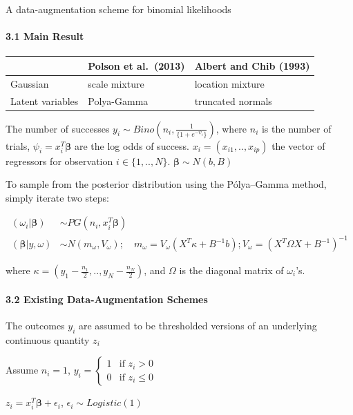 \documentclass[
]{article}
\begin{document}
A data-augmentation scheme for binomial likelihoods

\hypertarget{main-result}{%
\paragraph{3.1 Main Result}\label{main-result}}

\begin{longtable}[]{@{}lll@{}}
\toprule
& Polson et al.~(2013) & Albert and Chib (1993)\tabularnewline
\midrule
\endhead
Gaussian & scale mixture & location mixture\tabularnewline
Latent variables & Polya-Gamma & truncated normals\tabularnewline
\bottomrule
\end{longtable}

The number of successes
\(y_i\sim Bino(n_i,\frac{1}{\{1+e^{-\psi_i}\}})\), where \(n_i\) is the
number of trials, \(\psi_i=x_i^T\boldsymbol{\beta}\) are the log odds of
success. \(x_i=(x_{i1},..,x_{ip} )\) the vector of regressors for
observation \(i\in\{1,..,N\}\). \(\boldsymbol{\beta}\sim N(b,B)\)

To sample from the posterior distribution using the Pólya--Gamma method,
simply iterate two steps:

\[\begin{align}
(\omega_i|\boldsymbol{\beta})&\sim PG(n_i,x_i^T\boldsymbol{\beta})\\
(\boldsymbol{\beta}|y,\omega)&\sim N(m_\omega,V_\omega);\quad m_\omega=V_\omega(X^T\kappa+B^{-1}b);V_\omega=(X^T\Omega X+B^{-1})^{-1}
\end{align}\]

where \(\kappa=(y_1-\frac{n_1}2,..,y_N-\frac{n_N}2)\), and \(\Omega\) is
the diagonal matrix of \(\omega_i\)'s.

\hypertarget{existing-data-augmentation-schemes}{%
\paragraph{3.2 Existing Data-Augmentation
Schemes}\label{existing-data-augmentation-schemes}}

The outcomes \(y_i\) are assumed to be thresholded versions of an
underlying continuous quantity \(z_i\)

Assume \(n_i=1\),
\(y_i=\begin{cases}1&\text{if } z_i>0\\0&\text{if }z_i\le0\end{cases}\)

\(z_i=x_i^T\boldsymbol{\beta}+\epsilon_i\),
\(\epsilon_i\sim Logistic(1)\)
\end{document}
